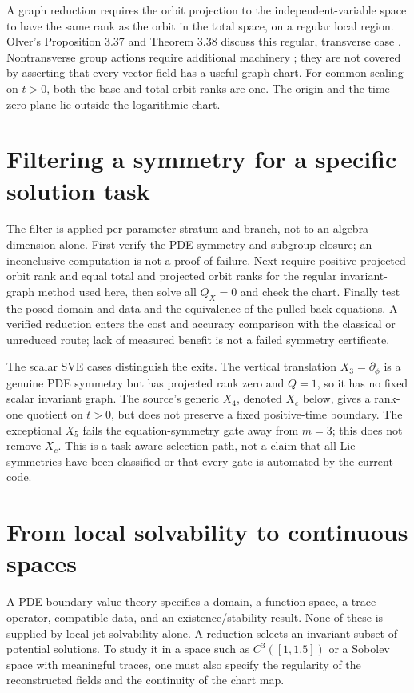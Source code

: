 \documentclass[12pt,a4paper,oneside]{report}
\numberwithin{equation}{chapter}
\begin{document}
A graph reduction requires the orbit projection to the independent-variable
space to have the same rank as the orbit in the total space, on a regular
local region. Olver's Proposition 3.37 and Theorem 3.38 discuss this regular,
transverse case \cite[pp.~233--234]{olver1986}. Nontransverse group actions
require additional machinery \cite{anderson2000}; they are not covered by
asserting that every vector field has a useful graph chart.
For common scaling on $t>0$, both the base and total orbit ranks are one.
The origin and the time-zero plane lie outside the logarithmic chart.

\section{Filtering a symmetry for a specific solution task}
The filter is applied per parameter stratum and branch, not to an algebra
dimension alone. First verify the PDE symmetry and subgroup closure; an
inconclusive computation is not a proof of failure. Next require positive
projected orbit rank and equal total and projected orbit ranks for the regular
invariant-graph method used here, then solve all $Q_X=0$ and check the chart.
Finally test the posed domain and data and the equivalence of the pulled-back
equations. A verified reduction enters the cost and accuracy comparison with
the classical or unreduced route; lack of measured benefit is not a failed
symmetry certificate.

The scalar SVE cases distinguish the exits. The vertical translation
$X_3=\partial_\phi$ is a genuine PDE symmetry but has projected rank zero
and $Q=1$, so it has no fixed scalar invariant graph. The source's generic
$X_4$, denoted $X_c$ below, gives a rank-one quotient on $t>0$, but does not
preserve a fixed positive-time boundary. The exceptional $X_5$ fails the
equation-symmetry gate away from $m=3$; this does not remove $X_c$.
This is a task-aware selection path, not a claim that all Lie symmetries have
been classified or that every gate is automated by the current code.

\section{From local solvability to continuous spaces}
A PDE boundary-value theory specifies a domain, a function space, a trace
operator, compatible data, and an existence/stability result. None of these
is supplied by local jet solvability alone. A reduction selects an invariant
subset of potential solutions. To study it in a space such as $C^3([1,1.5])$
or a Sobolev space with meaningful traces, one must also specify the regularity
of the reconstructed fields and the continuity of the chart map.
\end{document}
